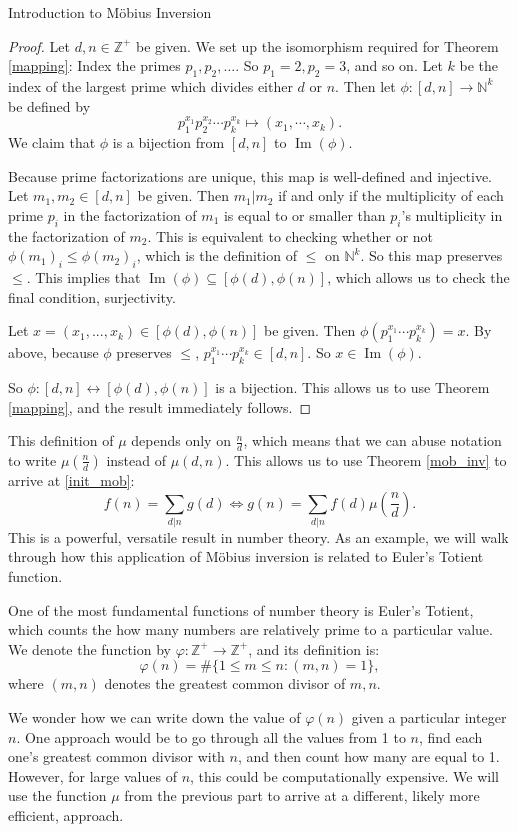 \documentclass[12pt]{pom_thesis}
\DeclareMathOperator{\im}{Im}
\newcommand{\Nn}{\mathbb{N}}
\newcommand{\Zz}{\mathbb{Z}}
\begin{document}
\begin{chapter}{Introduction to M\"obius Inversion}
\begin{proof}
Let $d,n \in \Zz^+$ be given. We set up the isomorphism required for Theorem \ref{mapping}: Index the primes $p_1, p_2, \dots$. So $p_1=2, p_2=3$, and so on. Let $k$ be the index of the largest prime which divides either $d$ or $n$. Then let $\phi : [d,n] \rightarrow \Nn^k$ be defined by
\[
 p_1^{x_1}p_2^{x_2}\cdots p_k^{x_k} \mapsto (x_1, \cdots, x_k).
\]
We claim that $\phi$ is a bijection from $[d,n]$ to $\im(\phi)$.

Because prime factorizations are unique, this map is well-defined and injective. Let $m_1, m_2 \in [d,n]$ be given. Then $m_1|m_2$ if and only if the multiplicity of each prime $p_i$ in the factorization of $m_1$ is equal to or smaller than $p_i$'s multiplicity in the factorization of $m_2$. This is equivalent to checking whether or not $\phi(m_1)_i \leq \phi(m_2)_i$, which is the definition of $\leq$ on $\Nn^k$. So this map preserves $\leq$. This implies that $\im(\phi) \subseteq [\phi(d), \phi(n)]$, which allows us to check the final condition, surjectivity. 

Let $x = (x_1,...,x_k) \in [\phi(d), \phi(n)]$ be given. Then $\phi(p_1^{x_1}\cdots p_k^{x_k}) = x$. By above, because $\phi$ preserves $\leq$, $p_1^{x_1}\cdots p_k^{x_k} \in [d,n]$. So $x \in \im(\phi)$. 

So $\phi:[d,n] \leftrightarrow [\phi(d), \phi(n)]$ is a bijection. This allows us to use Theorem \ref{mapping}, and the result immediately follows.
\end{proof}

This definition of $\mu$ depends only on $\frac nd$, which means that we can abuse notation to write $\mu(\frac nd)$ instead of $\mu(d,n)$. This allows us to use Theorem \ref{mob_inv} to arrive at \eqref{init_mob}:
\[
f(n) = \sum_{d | n} g(d) \iff g(n) = \sum_{d | n}  f(d)\mu\left(\frac nd\right).
\]
This is a powerful, versatile result in number theory. As an example, we will walk through how this application of M\"obius inversion is related to Euler's Totient function.
\begin{examp}
One of the most fundamental functions of number theory is Euler's Totient, which counts the how many numbers are relatively prime to a particular value. We denote the function by $\varphi : \Zz^+ \rightarrow \Zz^+$, and its definition is:
\[
\varphi(n) = \#\{1 \leq m \leq n : (m,n) = 1\},
\]
where $(m,n)$ denotes the greatest common divisor of $m,n$.

We wonder how we can write down the value of $\varphi(n)$ given a particular integer $n$. One approach would be to go through all the values from 1 to $n$, find each one's greatest common divisor with $n$, and then count how many are equal to 1. However, for large values of $n$, this could be computationally expensive. We will use the function $\mu$ from the previous part to arrive at a different, likely more efficient, approach.


\end{examp}
\end{chapter}
\end{document}
